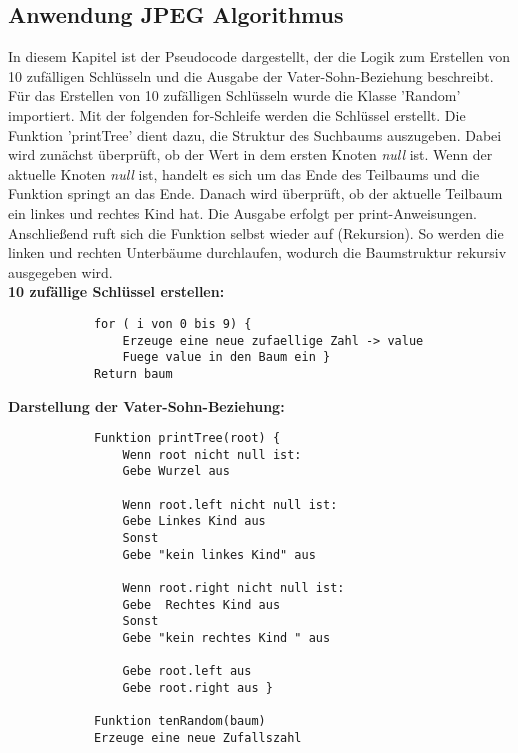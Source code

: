\documentclass[12pt]{article}
\begin{document}
		\subsection{Anwendung JPEG Algorithmus}
		In diesem Kapitel ist der Pseudocode dargestellt, der die Logik zum Erstellen von 10 zufälligen Schlüsseln und die Ausgabe der Vater-Sohn-Beziehung beschreibt. Für das Erstellen von 10 zufälligen Schlüsseln wurde die Klasse 'Random' importiert. Mit der folgenden for-Schleife werden die Schlüssel erstellt. Die Funktion 'printTree' dient dazu, die Struktur des Suchbaums auszugeben. Dabei wird zunächst überprüft, ob der Wert in dem ersten Knoten \textit{null} ist. Wenn der aktuelle Knoten \textit{null}  ist, handelt es sich um das Ende des Teilbaums und die Funktion springt an das Ende. Danach wird überprüft, ob der aktuelle Teilbaum ein linkes und rechtes Kind hat. Die Ausgabe erfolgt per print-Anweisungen. Anschließend ruft sich die Funktion selbst wieder auf (Rekursion). So werden die linken und rechten Unterbäume durchlaufen, wodurch die Baumstruktur rekursiv ausgegeben wird. \\
		\newline
		\textbf{10 zufällige Schlüssel erstellen:}
		\begin{lstlisting} 
			for ( i von 0 bis 9) {
				Erzeuge eine neue zufaellige Zahl -> value
				Fuege value in den Baum ein }
			Return baum
		\end{lstlisting} 
		\newpage %
		\textbf{Darstellung der Vater-Sohn-Beziehung:}
		\begin{lstlisting}
			Funktion printTree(root) {
				Wenn root nicht null ist:
				Gebe Wurzel aus
				
				Wenn root.left nicht null ist:
				Gebe Linkes Kind aus
				Sonst
				Gebe "kein linkes Kind" aus
				
				Wenn root.right nicht null ist:
				Gebe  Rechtes Kind aus
				Sonst
				Gebe "kein rechtes Kind " aus
				
				Gebe root.left aus
				Gebe root.right aus }
			
			Funktion tenRandom(baum)
			Erzeuge eine neue Zufallszahl
			
		\end{lstlisting}
		
\end{document}
